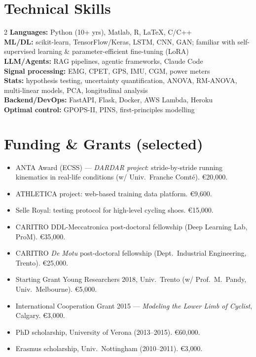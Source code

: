 \documentclass[10pt,a4paper]{article}
\begin{document}
\section{Technical Skills}

\begin{multicols}{2}
\textbf{Languages:} Python (10+ yrs), Matlab, R, \LaTeX, C/C++\\
\textbf{ML/DL:} scikit-learn, TensorFlow/Keras, LSTM, CNN, GAN; familiar with self-supervised learning \& parameter-efficient fine-tuning (LoRA)\\
\textbf{LLM/Agents:} RAG pipelines, agentic frameworks, Claude Code\\
\textbf{Signal processing:} EMG, CPET, GPS, IMU, CGM, power meters\\
\textbf{Stats:} hypothesis testing, uncertainty quantification, ANOVA, RM-ANOVA, multi-linear models, PCA, longitudinal analysis\\
\textbf{Backend/DevOps:} FastAPI, Flask, Docker, AWS Lambda, Heroku\\
\textbf{Optimal control:} GPOPS-II, PINS, first-principles modelling
\end{multicols}

\section{Funding \& Grants (selected)}

\begin{itemize}
  \item ANTA Award (ECSS) — \textit{DARDAR project}: stride-by-stride running kinematics in real-life conditions (w/ Univ.\ Franche Comté). €20{,}000.
  \item ATHLETICA project: web-based training data platform. €9{,}600.
  \item Selle Royal: testing protocol for high-level cycling shoes. €15{,}000.
  \item CARITRO DDL-Meccatronica post-doctoral fellowship (Deep Learning Lab, ProM). €35{,}000.
  \item CARITRO \textit{De Motu} post-doctoral fellowship (Dept.\ Industrial Engineering, Trento). €25{,}000.
  \item Starting Grant Young Researchers 2018, Univ.\ Trento (w/ Prof.\ M.\ Pandy, Univ.\ Melbourne). €5{,}000.
  \item International Cooperation Grant 2015 — \textit{Modeling the Lower Limb of Cyclist}, Calgary. €3{,}000.
  \item PhD scholarship, University of Verona (2013–2015). €60{,}000.
  \item Erasmus scholarship, Univ.\ Nottingham (2010–2011). €3{,}000.
\end{itemize}
\end{document}
